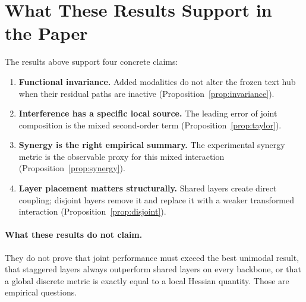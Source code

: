 \documentclass[11pt]{article}
\begin{document}
\section{What These Results Support in the Paper}

The results above support four concrete claims:
\begin{enumerate}
\item \textbf{Functional invariance.} Added modalities do not alter the frozen
text hub when their residual paths are inactive
(Proposition~\ref{prop:invariance}).
\item \textbf{Interference has a specific local source.} The leading error of
joint composition is the mixed second-order term
(Proposition~\ref{prop:taylor}).
\item \textbf{Synergy is the right empirical summary.} The experimental synergy
metric is the observable proxy for this mixed interaction
(Proposition~\ref{prop:synergy}).
\item \textbf{Layer placement matters structurally.} Shared layers create direct
coupling; disjoint layers remove it and replace it with a weaker transformed
interaction (Proposition~\ref{prop:disjoint}).
\end{enumerate}

\paragraph{What these results do not claim.}
They do not prove that joint performance must exceed the best unimodal result,
that staggered layers always outperform shared layers on every backbone, or
that a global discrete metric is exactly equal to a local Hessian quantity.
Those are empirical questions.
\end{document}
